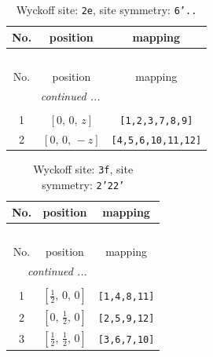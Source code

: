 \documentclass[fleqn,8pt]{jsarticle}
\begin{document}
\begin{longtable}{ccc}
\caption{Wyckoff site: {\tt 2e}, site symmetry: {\tt 6'..}}
 \\
 \hline \hline
No. & position & mapping \\ \hline \endfirsthead

\multicolumn{2}{l}{\tablename\ \thetable{}} \\
 \hline \hline
No. & position & mapping \\ \hline \endhead

 \hline \hline
\multicolumn{2}{r}{\footnotesize\it continued ...} \\ \endfoot

 \hline \hline
\multicolumn{2}{r}{} \\ \endlastfoot

1 & $\left[ 0,\, 0,\, z \right]$ & {\tt [1,2,3,7,8,9]} \\ \hline
2 & $\left[ 0,\, 0,\, - z \right]$ & {\tt [4,5,6,10,11,12]} \\
\end{longtable}
\renewcommand{\arraystretch}{1.2}
\begin{longtable}{ccc}
\caption{Wyckoff site: {\tt 3f}, site symmetry: {\tt 2'22'}}
 \\
 \hline \hline
No. & position & mapping \\ \hline \endfirsthead

\multicolumn{2}{l}{\tablename\ \thetable{}} \\
 \hline \hline
No. & position & mapping \\ \hline \endhead

 \hline \hline
\multicolumn{2}{r}{\footnotesize\it continued ...} \\ \endfoot

 \hline \hline
\multicolumn{2}{r}{} \\ \endlastfoot

1 & $\left[ \frac{1}{2},\, 0,\, 0 \right]$ & {\tt [1,4,8,11]} \\ \hline
2 & $\left[ 0,\, \frac{1}{2},\, 0 \right]$ & {\tt [2,5,9,12]} \\ \hline
3 & $\left[ \frac{1}{2},\, \frac{1}{2},\, 0 \right]$ & {\tt [3,6,7,10]} \\
\end{longtable}
\renewcommand{\arraystretch}{1.2}
\end{document}
